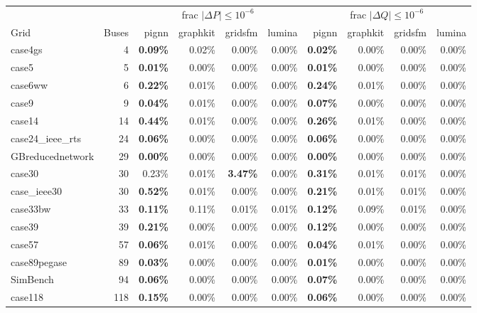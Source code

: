 \documentclass[10pt]{article}
\begin{document}
\begin{table}[H]
\centering\small
\setlength{\tabcolsep}{3.5pt}
\begin{tabular}{lr rrrr rrrr}
\toprule
 & & \multicolumn{4}{c}{frac $|\Delta P| \le 10^{-6}$} & \multicolumn{4}{c}{frac $|\Delta Q| \le 10^{-6}$} \\
\cmidrule(lr){3-6}\cmidrule(lr){7-10}
Grid & Buses & pignn & graphkit & gridsfm & lumina & pignn & graphkit & gridsfm & lumina \\
\midrule
case4gs & 4 & \textbf{0.09\%} & 0.02\% & 0.00\% & 0.00\% & \textbf{0.02\%} & 0.00\% & 0.00\% & 0.00\% \\
case5 & 5 & \textbf{0.01\%} & 0.00\% & 0.00\% & 0.00\% & \textbf{0.01\%} & 0.00\% & 0.00\% & 0.00\% \\
case6ww & 6 & \textbf{0.22\%} & 0.01\% & 0.00\% & 0.00\% & \textbf{0.24\%} & 0.01\% & 0.00\% & 0.00\% \\
case9 & 9 & \textbf{0.04\%} & 0.01\% & 0.00\% & 0.00\% & \textbf{0.07\%} & 0.00\% & 0.00\% & 0.00\% \\
case14 & 14 & \textbf{0.44\%} & 0.01\% & 0.00\% & 0.00\% & \textbf{0.26\%} & 0.01\% & 0.00\% & 0.00\% \\
case24\_ieee\_rts & 24 & \textbf{0.06\%} & 0.00\% & 0.00\% & 0.00\% & \textbf{0.06\%} & 0.00\% & 0.00\% & 0.00\% \\
GBreducednetwork & 29 & \textbf{0.00\%} & 0.00\% & 0.00\% & 0.00\% & \textbf{0.00\%} & 0.00\% & 0.00\% & 0.00\% \\
case30 & 30 & 0.23\% & 0.01\% & \textbf{3.47\%} & 0.00\% & \textbf{0.31\%} & 0.01\% & 0.01\% & 0.00\% \\
case\_ieee30 & 30 & \textbf{0.52\%} & 0.01\% & 0.00\% & 0.00\% & \textbf{0.21\%} & 0.01\% & 0.01\% & 0.00\% \\
case33bw & 33 & \textbf{0.11\%} & 0.11\% & 0.01\% & 0.01\% & \textbf{0.12\%} & 0.09\% & 0.01\% & 0.00\% \\
case39 & 39 & \textbf{0.21\%} & 0.00\% & 0.00\% & 0.00\% & \textbf{0.12\%} & 0.00\% & 0.00\% & 0.00\% \\
case57 & 57 & \textbf{0.06\%} & 0.01\% & 0.00\% & 0.00\% & \textbf{0.04\%} & 0.01\% & 0.00\% & 0.00\% \\
case89pegase & 89 & \textbf{0.03\%} & 0.00\% & 0.00\% & 0.00\% & \textbf{0.01\%} & 0.00\% & 0.00\% & 0.00\% \\
SimBench & 94 & \textbf{0.06\%} & 0.00\% & 0.00\% & 0.00\% & \textbf{0.07\%} & 0.00\% & 0.00\% & 0.00\% \\
case118 & 118 & \textbf{0.15\%} & 0.00\% & 0.00\% & 0.00\% & \textbf{0.06\%} & 0.00\% & 0.00\% & 0.00\% \\

\end{tabular}
\end{table}
\end{document}
